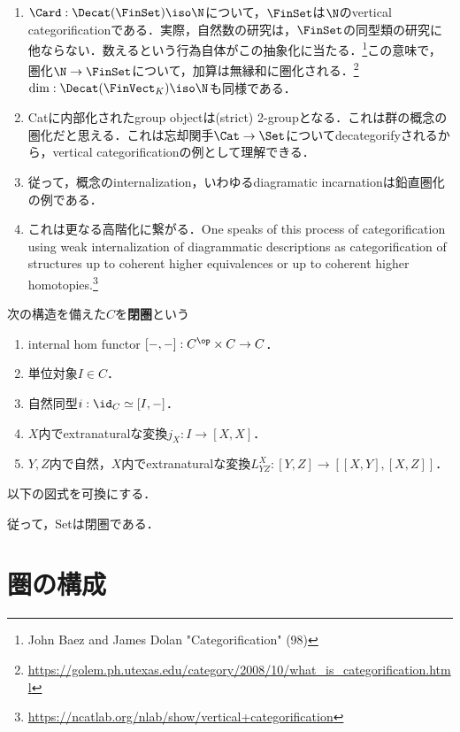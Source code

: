 \documentclass[uplatex,dvipdfmx]{jsreport}
\begin{document}
\begin{example}\mbox{}
    \begin{enumerate}
        \item $\Card:\Decat(\FinSet)\iso\N$について，$\FinSet$は$\N$のvertical categorificationである．実際，自然数の研究は，$\FinSet$の同型類の研究に他ならない．数えるという行為自体がこの抽象化に当たる．\footnote{John Baez and James Dolan "Categorification" (98)}この意味で，圏化$\N\to\FinSet$について，加算は無縁和に圏化される．\footnote{\url{https://golem.ph.utexas.edu/category/2008/10/what_is_categorification.html}}$\dim:\Decat(\FinVect_K)\iso\N$も同様である．
        \item Catに内部化されたgroup objectは(strict) 2-groupとなる．これは群の概念の圏化だと思える．これは忘却関手$\Cat\to\Set$についてdecategorifyされるから，vertical categorificationの例として理解できる．
        \item 従って，概念のinternalization，いわゆるdiagramatic incarnationは鉛直圏化の例である．
        \item これは更なる高階化に繋がる．One speaks of this process of categorification using weak internalization of diagrammatic descriptions as categorification of structures up to coherent higher equivalences or up to coherent higher homotopies.\footnote{\url{https://ncatlab.org/nlab/show/vertical+categorification}}
    \end{enumerate}
\end{example}

\begin{definition}[closed]
    次の構造を備えた$C$を\textbf{閉圏}という
    \begin{enumerate}
        \item internal hom functor $[-,-]:C^\op\times C\to C$．
        \item 単位対象$I\in C$．
        \item 自然同型$i:\id_C\simeq[I,-]$．
        \item $X$内でextranaturalな変換$j_X:I\to[X,X]$．
        \item $Y,Z$内で自然，$X$内でextranaturalな変換$L^X_{YZ}:[Y,Z]\to[[X,Y],[X,Z]]$．
    \end{enumerate}
    以下の図式を可換にする．
\end{definition}
\begin{example}
    従って，Setは閉圏である．
\end{example}

\section{圏の構成}
\end{document}
